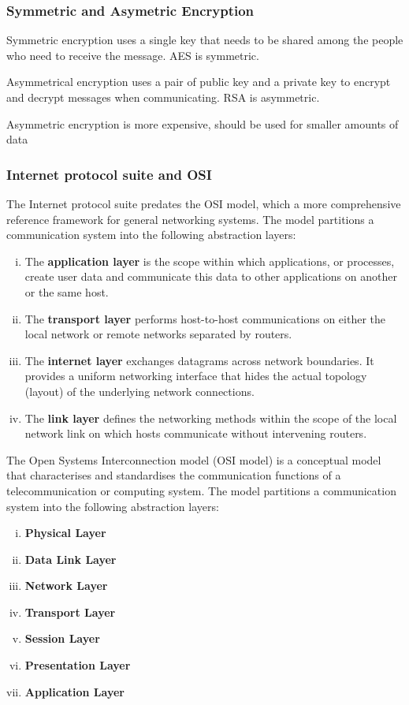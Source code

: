 \documentclass{article}
\begin{document}
    \subsubsection{Symmetric and Asymetric Encryption}
    Symmetric encryption uses a single key that needs to be shared among the people who need to receive the message. AES is symmetric.
    
    Asymmetrical encryption uses a pair of public key and a private key to encrypt and decrypt messages when communicating. RSA is asymmetric.
    
    Asymmetric encryption is more expensive, should be used for smaller amounts of data
    
    \subsubsection{Internet protocol suite and OSI}
    
    The Internet protocol suite predates the OSI model, which a more comprehensive reference framework for general networking systems. The model partitions a communication system into the following abstraction layers:
    \begin{enumerate}[i.]
        \item The \textbf{application layer} is the scope within which applications, or processes, create user data and communicate this data to other applications on another or the same host.
        \item The \textbf{transport layer} performs host-to-host communications on either the local network or remote networks separated by routers.
        \item The \textbf{internet layer} exchanges datagrams across network boundaries. It provides a uniform networking interface that hides the actual topology (layout) of the underlying network connections.
        \item The \textbf{link layer} defines the networking methods within the scope of the local network link on which hosts communicate without intervening routers.
    \end{enumerate}
    
    The Open Systems Interconnection model (OSI model) is a conceptual model that characterises and standardises the communication functions of a telecommunication or computing system. The model partitions a communication system into the following abstraction layers:

    \begin{enumerate}[i.]
        \item \textbf{Physical Layer}
        \item \textbf{Data Link Layer}
        \item \textbf{Network Layer}
        \item \textbf{Transport Layer}
        \item \textbf{Session Layer}
        \item \textbf{Presentation Layer}
        \item \textbf{Application Layer}
    \end{enumerate}
    
\end{document}
